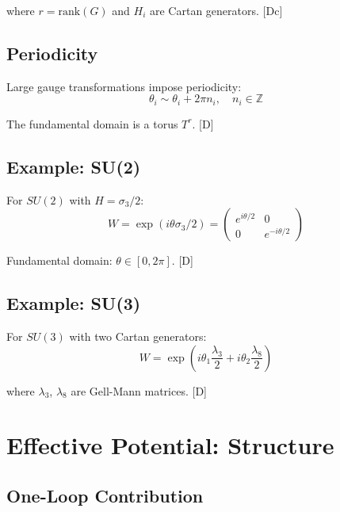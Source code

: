 \documentclass[11pt,a4paper]{article}
\newcommand{\tagD}{\textcolor{blue!70!black}{[D]}}
\newcommand{\tagDc}{\textcolor{blue!50!black}{[Dc]}}
\begin{document}
where $r = \text{rank}(G)$ and $H_i$ are Cartan generators. \tagDc

\subsection{Periodicity}

Large gauge transformations impose periodicity:
\begin{equation}
\label{eq:periodicity}
\theta_i \sim \theta_i + 2\pi n_i, \quad n_i \in \mathbb{Z}
\end{equation}

The fundamental domain is a torus $T^r$. \tagD

\subsection{Example: SU(2)}

For $SU(2)$ with $H = \sigma_3/2$:
\begin{equation}
\label{eq:su2-wilson}
W = \exp(i\theta \sigma_3/2) = \begin{pmatrix} e^{i\theta/2} & 0 \\ 0 & e^{-i\theta/2} \end{pmatrix}
\end{equation}

Fundamental domain: $\theta \in [0, 2\pi]$. \tagD

\subsection{Example: SU(3)}

For $SU(3)$ with two Cartan generators:
\begin{equation}
\label{eq:su3-wilson}
W = \exp\left(i\theta_1 \frac{\lambda_3}{2} + i\theta_2 \frac{\lambda_8}{2}\right)
\end{equation}

where $\lambda_3$, $\lambda_8$ are Gell-Mann matrices. \tagD

\section{Effective Potential: Structure}

\subsection{One-Loop Contribution}
\end{document}
